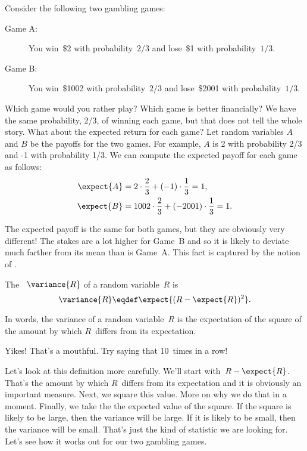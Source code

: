 Consider the following two gambling games:
\begin{description}

\item[Game A:]

You win~\$2 with probability~$2/3$ and lose~\$1 with
probability~$1/3$.

\item[Game B:]

You win~\$1002 with probability~$2/3$ and lose~\$2001 with
probability~$1/3$.

\end{description}
Which game would you rather play?  Which game is better financially?
We have the same probability, 2/3, of winning each game, but that does
not tell the whole story.  What about the expected return for each
game?  Let random variables $A$ and $B$ be the payoffs for the two
games.  For example, $A$ is 2 with probability 2/3 and -1 with
probability 1/3.  We can compute the expected payoff for each game as
follows:
\begin{align*}
    \expect{A} &= 2 \cdot \frac{2}{3} + (-1) \cdot \frac{1}{3} = 1, \\
    \expect{B} &= 1002 \cdot \frac{2}{3} + (-2001) \cdot \frac{1}{3} = 1.
\end{align*}

The expected payoff is the same for both games, but they are obviously
very different! The stakes are a lot higher for Game~B and so it is
likely to deviate much farther from its mean than is Game~A\@.  This
fact is captured by the notion of .

\begin{definition}\label{defvar}
The ~$\variance{R}$ of a random variable~$R$ is
\[
    \variance{R} \eqdef \expect{(R - \expect{R})^2}.
\]
\end{definition}

In words, the variance of a random variable~$R$ is the expectation of
the square of the amount by which $R$~differs from its expectation.

Yikes!  That's a mouthful.  Try saying that 10~times in a row!

Let's look at this definition more carefully.  We'll start with~$R -
\expect{R}$.  That's the amount by which $R$~differs from its
expectation and it is obviously an important measure.  Next, we square
this value.  More on why we do that in a moment.  Finally, we take the
the expected value of the square.  If the square is likely to be
large, then the variance will be large.  If it is likely to be small,
then the variance will be small.  That's just the kind of statistic we
are looking for.  Let's see how it works out for our two gambling
games.

